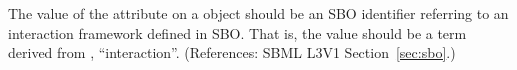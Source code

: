 The value of the attribute  on a \Model object should be an
SBO identifier referring to an interaction framework defined in SBO.  That
is, the value should be a term derived from \sbointeractionID,
``interaction''.  (References: SBML L3V1 Section~\ref{sec:sbo}.)
